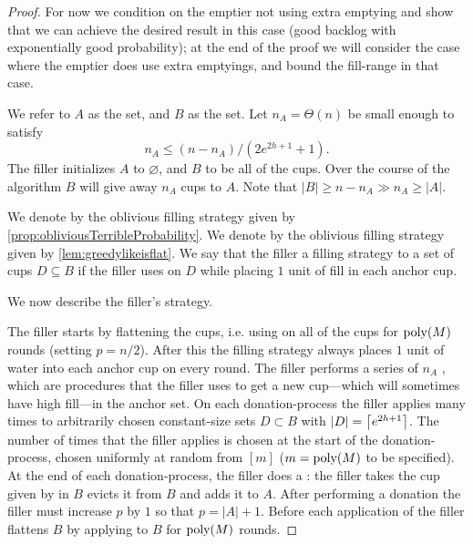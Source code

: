\begin{proof}
  For now we condition on the emptier not using extra emptying
  and show that we can achieve the desired result in this case
  (good backlog with exponentially good probability);
  at the end of the proof we will consider the case where the
  emptier does use extra emptyings, and bound the fill-range in
  that case. 

  We refer to $A$ as the  set, and $B$ as the
   set. Let $n_A = \Theta(n)$ be small enough to
  satisfy
  \begin{equation}
    \label{eq:chooseBmuchbiggerthanA}
    n_A \le (n - n_A) / (2e^{2h+1} + 1).
  \end{equation}
  The filler initializes $A$ to $\varnothing$, and $B$ to be all
  of the cups. Over the course of the algorithm $B$ will give
  away $n_A$ cups to $A$. Note that $|B| \ge n-n_A \gg n_A \ge |A|$.

We denote by \randalg the oblivious filling
strategy given by \cref{prop:obliviousTerribleProbability}. 
We denote by \flatalg the oblivious filling
strategy given by \cref{lem:greedylikeisflat}.
We say that the filler  a filling strategy
\genericalg to a set of cups $D \subseteq B$ if the filler uses
\genericalg on $D$ while placing $1$ unit of fill in each anchor cup. 

We now describe the filler's strategy.

The filler starts by flattening the cups, i.e. using \flatalg on
all of the cups for $\operatorname{\text{poly}}(M)$ rounds (setting $p=n/2$). After
this the filling strategy always places $1$ unit of water into
each anchor cup on every round. The filler performs a series of
$n_A$ , which are
procedures that the filler uses to get a new cup---which will
sometimes have high fill---in the anchor set. On each
donation-process the filler applies \randalg many times to
arbitrarily chosen constant-size sets $D \subset B$ with $|D| =
\left\lceil e^{2h+1} \right\rceil$. The number of times that the filler applies
\randalg is chosen at the start of the donation-process, chosen
uniformly at random from $[m]$ ($m = \operatorname{\text{poly}}(M)$ to be specified).
At the end of each donation-process, the filler does a
: the filler takes the cup given by \randalg in
$B$ evicts it from $B$ and adds it to $A$. After performing a
donation the filler must increase $p$ by $1$ so that $p=|A| + 1$.
Before each application of \randalg the filler flattens $B$ by
applying \flatalg to $B$ for $\operatorname{\text{poly}}(M)$ rounds. 


\end{proof}
